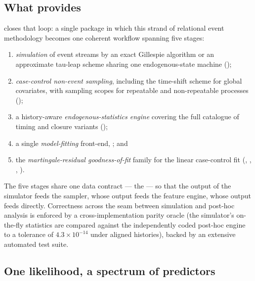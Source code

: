 \subsection{What  provides}
\label{sec:what-amore-provides}

 closes that loop: a single  package in which this
strand of relational event methodology becomes one coherent workflow
spanning five stages:

\begin{enumerate}
  \item \emph{simulation} of event streams by an exact Gillespie algorithm or an
  approximate tau-leap scheme sharing one endogenous-state machine
  ();
  \item \emph{case-control non-event sampling}, including the \citet{lembo2025}
  time-shift scheme for global covariates, with sampling scopes for repeatable
  and non-repeatable processes ();
  \item a history-aware \emph{endogenous-statistics engine} covering the
  full catalogue of timing and closure variants
  ();
  \item a single \emph{model-fitting} front-end, ; and
  \item the \citet{boschi2025gof} \emph{martingale-residual goodness-of-fit}
  family for the linear case-control fit (,
  , , ).
\end{enumerate}

The five stages share one data contract --- the  ---
so that the output of the simulator feeds the sampler, whose output feeds the
feature engine, whose output feeds  directly. Correctness across
the seam between simulation and post-hoc analysis is enforced by a
cross-implementation parity oracle (the simulator's
on-the-fly statistics are compared against the independently coded post-hoc
engine to a tolerance of $4.3\times10^{-14}$ under aligned histories), backed
by an extensive automated test suite.

\subsection{One likelihood, a spectrum of predictors}
\label{sec:one-likelihood}

